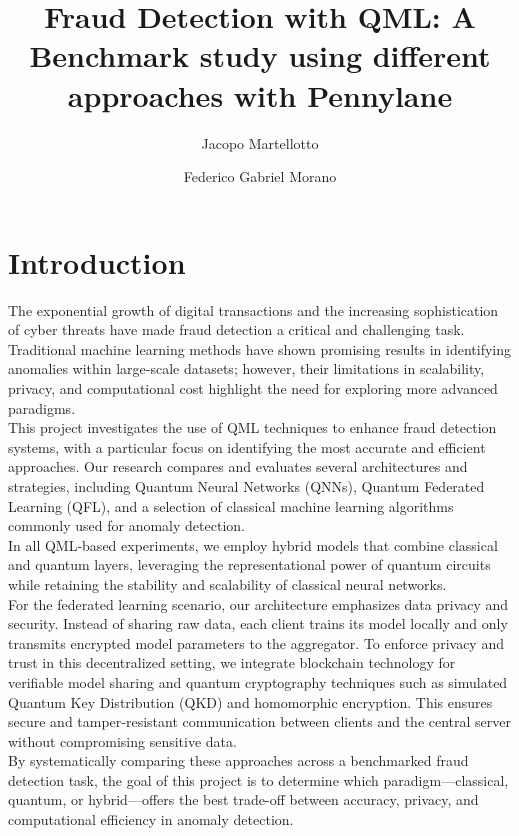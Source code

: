 \documentclass[10pt]{article}
\title{\textbf{Fraud Detection with QML: A Benchmark study using different approaches with Pennylane}}
\author[1]{Jacopo Martellotto}
\affil[1]{\small\texttt{j.martellotto@studenti.unipi.it}}
\date{}
\author[2]{Federico Gabriel Morano}
\affil[2]{\small\texttt{f.morano1@studenti.unipi.it}}
\date{}
\begin{document}
\maketitle

\section{Introduction}
The exponential growth of digital transactions and the increasing sophistication of cyber threats have made fraud detection a critical and challenging task. Traditional machine learning methods have shown promising results in identifying anomalies within large-scale datasets; however, their limitations in scalability, privacy, and computational cost highlight the need for exploring more advanced paradigms.\\
This project investigates the use of QML techniques to enhance fraud detection systems, with a particular focus on identifying the most accurate and efficient approaches. Our research compares and evaluates several architectures and strategies, including Quantum Neural Networks (QNNs), Quantum Federated Learning (QFL), and a selection of classical machine learning algorithms commonly used for anomaly detection.\\
In all QML-based experiments, we employ hybrid models that combine classical and quantum layers, leveraging the representational power of quantum circuits while retaining the stability and scalability of classical neural networks.\\
For the federated learning scenario, our architecture emphasizes data privacy and security. Instead of sharing raw data, each client trains its model locally and only transmits encrypted model parameters to the aggregator. To enforce privacy and trust in this decentralized setting, we integrate blockchain technology for verifiable model sharing and quantum cryptography techniques such as simulated Quantum Key Distribution (QKD) and homomorphic encryption. This ensures secure and tamper-resistant communication between clients and the central server without compromising sensitive data.\\
By systematically comparing these approaches across a benchmarked fraud detection task, the goal of this project is to determine which paradigm—classical, quantum, or hybrid—offers the best trade-off between accuracy, privacy, and computational efficiency in anomaly detection.
\end{document}
